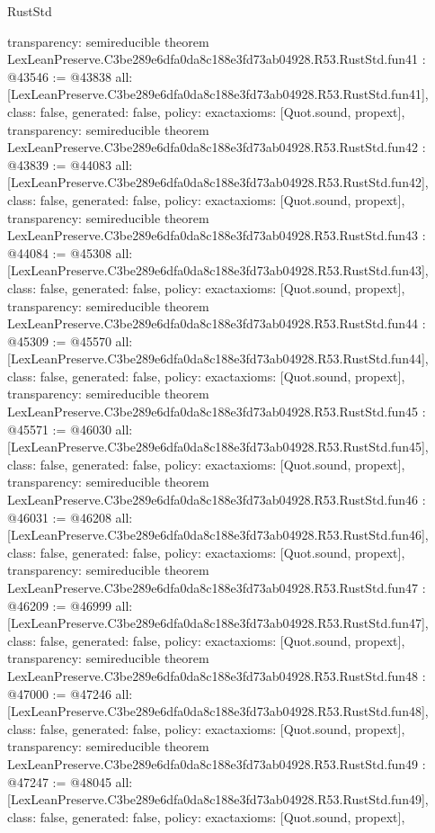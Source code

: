 \begin{lexlean}{RustStd}
\begin{coremodule}
{  transparency: semireducible
}
theorem LexLeanPreserve.C3be289e6dfa0da8c188e3fd73ab04928.R53.RustStd.fun41 : @43546 := @43838 {
  all: [LexLeanPreserve.C3be289e6dfa0da8c188e3fd73ab04928.R53.RustStd.fun41],
  class: false,
  generated: false,
  policy: exact{axioms: [Quot.sound, propext]},
  transparency: semireducible
}
theorem LexLeanPreserve.C3be289e6dfa0da8c188e3fd73ab04928.R53.RustStd.fun42 : @43839 := @44083 {
  all: [LexLeanPreserve.C3be289e6dfa0da8c188e3fd73ab04928.R53.RustStd.fun42],
  class: false,
  generated: false,
  policy: exact{axioms: [Quot.sound, propext]},
  transparency: semireducible
}
theorem LexLeanPreserve.C3be289e6dfa0da8c188e3fd73ab04928.R53.RustStd.fun43 : @44084 := @45308 {
  all: [LexLeanPreserve.C3be289e6dfa0da8c188e3fd73ab04928.R53.RustStd.fun43],
  class: false,
  generated: false,
  policy: exact{axioms: [Quot.sound, propext]},
  transparency: semireducible
}
theorem LexLeanPreserve.C3be289e6dfa0da8c188e3fd73ab04928.R53.RustStd.fun44 : @45309 := @45570 {
  all: [LexLeanPreserve.C3be289e6dfa0da8c188e3fd73ab04928.R53.RustStd.fun44],
  class: false,
  generated: false,
  policy: exact{axioms: [Quot.sound, propext]},
  transparency: semireducible
}
theorem LexLeanPreserve.C3be289e6dfa0da8c188e3fd73ab04928.R53.RustStd.fun45 : @45571 := @46030 {
  all: [LexLeanPreserve.C3be289e6dfa0da8c188e3fd73ab04928.R53.RustStd.fun45],
  class: false,
  generated: false,
  policy: exact{axioms: [Quot.sound, propext]},
  transparency: semireducible
}
theorem LexLeanPreserve.C3be289e6dfa0da8c188e3fd73ab04928.R53.RustStd.fun46 : @46031 := @46208 {
  all: [LexLeanPreserve.C3be289e6dfa0da8c188e3fd73ab04928.R53.RustStd.fun46],
  class: false,
  generated: false,
  policy: exact{axioms: [Quot.sound, propext]},
  transparency: semireducible
}
theorem LexLeanPreserve.C3be289e6dfa0da8c188e3fd73ab04928.R53.RustStd.fun47 : @46209 := @46999 {
  all: [LexLeanPreserve.C3be289e6dfa0da8c188e3fd73ab04928.R53.RustStd.fun47],
  class: false,
  generated: false,
  policy: exact{axioms: [Quot.sound, propext]},
  transparency: semireducible
}
theorem LexLeanPreserve.C3be289e6dfa0da8c188e3fd73ab04928.R53.RustStd.fun48 : @47000 := @47246 {
  all: [LexLeanPreserve.C3be289e6dfa0da8c188e3fd73ab04928.R53.RustStd.fun48],
  class: false,
  generated: false,
  policy: exact{axioms: [Quot.sound, propext]},
  transparency: semireducible
}
theorem LexLeanPreserve.C3be289e6dfa0da8c188e3fd73ab04928.R53.RustStd.fun49 : @47247 := @48045 {
  all: [LexLeanPreserve.C3be289e6dfa0da8c188e3fd73ab04928.R53.RustStd.fun49],
  class: false,
  generated: false,
  policy: exact{axioms: [Quot.sound, propext]},
}
\end{coremodule}
\end{lexlean}
